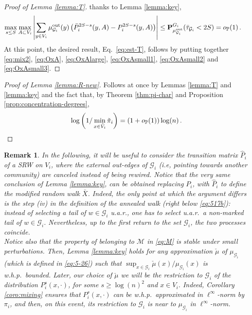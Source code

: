 \documentclass[11pt,oneside]{amsart}
\numberwithin{equation}{section}  %
\theoremstyle{plain}
\newtheorem{remark}[theorem]{Remark}
\newcommand{\whp}{{w.h.p.~}}
\newcommand{\p}{\mathbb{P}}
\newcommand{\op}{o_{\p}}
\newcommand{\quench}{\mathbf{P}}
\newcommand{\gates}{\mathcal{G}}
\newcommand{\mub}{\mu_{\gates_i}}
\newcommand{\muout}{\mu^{\rm out}_{\gates_i}}
\begin{document}
\begin{proof}[Proof of Lemma \ref{lemma:T}]
 thanks to  Lemma \ref{lemma:key},
 \begin{equation}\label{eq:OxAsmall3}
 	\begin{split}
 		\max_{s\le S}\max_{A\subset V_i}\left|\sum_{y\in V_i}\muout(y)\left( \bar P_i^{2S-s}(y,A)-P_i^{2S-s}(y,A)\right) \right|&\le {\quench}^{G_i}_{\muout}(\bar{\tau}_{\gates_i}<{2S})=\op(1)\,.
 	\end{split}
 \end{equation}
%
At this point, the desired result, Eq.~\eqref{eq:est-T},
follows by putting together \eqref{eq:mix2}, \eqref{eq:OxA}, \eqref{eq:OxAlarge}, \eqref{eq:OxAsmall1}, \eqref{eq:OxAsmall2} and \eqref{eq:OxAsmall3}.
\end{proof}
	\begin{proof}[Proof of Lemma \ref{lemma:R-new}]
Follows at once by Lemmas \ref{lemma:T} and \ref{lemma:key} and the fact that, by Theorem \ref{thm:pi-char} and Proposition \ref{prop:concentration-degrees},
\begin{equation}
	\log\bigg(1/\min_{x\in \tilde V_i}\tilde{\pi}_i\bigg)=(1+\op (1))\log(n)\,.\qedhere
\end{equation}
\end{proof}

\begin{remark}\label{rmk:muout}
 In the following, it will be useful to consider the transition matrix $\hat P_i$ of a SRW on $V_i$, where the external out-edges of $\mathcal{G}_i$ (i.e, pointing towards another community) are canceled instead of being rewired. 
	Notice that the very same conclusion of Lemma \ref{lemma:key}, can be obtained replacing $P_i$, with $ \hat P_i$ to define the modified random walk $\bar X$. 
    Indeed, the only point at which the argument differs is the step (iv) in the definition of the annealed walk (right below \eqref{eq:517b}): instead of selecting a tail of $w\in\gates_i$ u.a.r., one has to select u.a.r.\ a \emph{non-marked} tail of $w\in\gates_i$. 
    Nevertheless, up to the first return to the set $\gates_i$, the two processes coincide. \\
    Notice also that the property of belonging to $\mathcal{M}$ in \eqref{eq:M} is stable under small perturbations. Then, Lemma \ref{lemma:key} holds for any approximation $\check{\mu}$ of $\mub$ (which is defined in \eqref{eq:5-26}) such that $\sup_{x \in \gates_i} \check{\mu}(x)/{\mub(x)}$ is \whp bounded. 
    Later, our choice of $\check \mu$ we will be the restriction to $\gates_i$ of the distribution $P_i^{s}(x,\cdot)$, for some $s \ge \log(n)^2$ and $x \in V_i$.
Indeed, Corollary \ref{coro:mixing} ensures that $P_i^{s}(x,\cdot)$ can be \whp approximated in $\ell^\infty$-norm by $\pi_i$, and then, on this event, its restriction to $\gates_i$ is near to $\mub$ in $\ell^\infty$-norm.
\end{remark}
%
\end{document}
